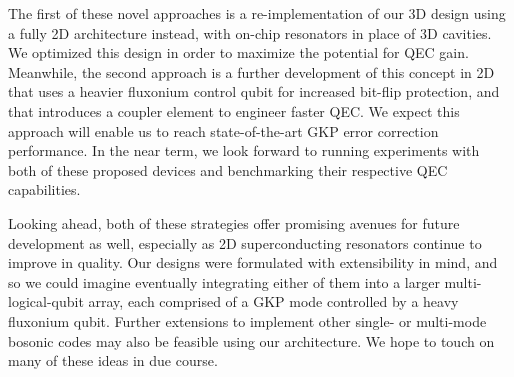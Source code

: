 The first of these novel approaches is a re-implementation of our 3D design using a fully 2D architecture instead, with on-chip resonators in place of 3D cavities. We optimized this design in order to maximize the potential for QEC gain. Meanwhile, the second approach is a further development of this concept in 2D that uses a heavier fluxonium control qubit for increased bit-flip protection, and that introduces a coupler element to engineer faster QEC. We expect this approach will enable us to reach state-of-the-art GKP error correction performance. In the near term, we look forward to running experiments with both of these proposed devices and benchmarking their respective QEC capabilities. 

Looking ahead, both of these strategies offer promising avenues for future development as well, especially as 2D superconducting resonators continue to improve in quality. Our designs were formulated with extensibility in mind, and so we could imagine eventually integrating either of them into a larger multi-logical-qubit array, each comprised of a GKP mode controlled by a heavy fluxonium qubit. Further extensions to implement other single- or multi-mode bosonic codes may also be feasible using our architecture. We hope to touch on many of these ideas in due course. 